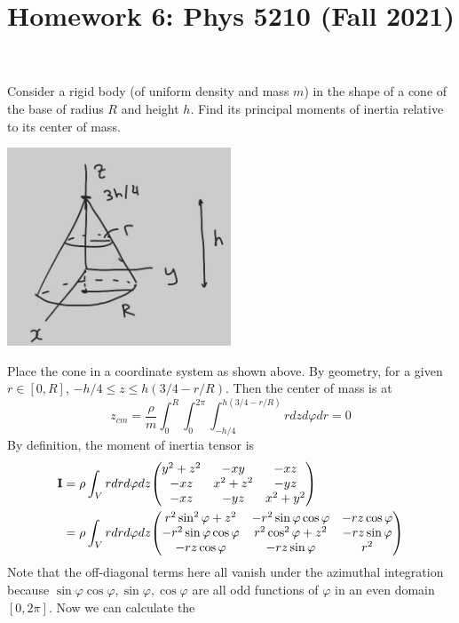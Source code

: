 \documentclass[12pt]{article}
\title{Homework 6: Phys 5210 (Fall 2021)}
\begin{document}
\maketitle
\begin{problem}{1}
Consider a rigid body (of uniform density and mass $m$) in the shape of a cone
of the base of radius $R$ and height $h$. Find its principal moments of inertia
relative to its center of mass.
\begin{solution}
\begin{center}
    \includegraphics[width=0.5\textwidth]{hw6_p1.jpg} 
\end{center}
Place the cone in a coordinate system as shown above. By geometry, for a given
$r\in[0,R]$, $-h /4\leq z\leq h(3 /4-r /R)$. Then the center of mass is at
\begin{equation}
    z_{cm}=\frac{\rho}{m}
        \int_0^R\int_0^{2\pi}\int_{-h/4}^{h(3/4-r/R)}rdzd\varphi dr
    =0
\end{equation}
By definition, the moment of inertia tensor is
\begin{align}
    \vb{I}&=\rho\int_Vrdrd\varphi dz\mqty(
        y^2+z^2 & -xy & -xz\\
        -xz & x^2 + z^2 & -yz\\
        -xz & -yz & x^2+y^2
    )\notag\\
    &=\rho\int_Vrdrd\varphi dz\mqty(
        r^2\sin^2\varphi+z^2 & -r^2\sin\varphi\cos\varphi & -rz\cos\varphi\\
        -r^2\sin\varphi\cos\varphi & r^2\cos^2\varphi+z^2 & -rz\sin\varphi\\
        -rz\cos\varphi & -rz\sin\varphi & r^2
    )
\end{align}
Note that the off-diagonal terms here all vanish under the azimuthal
integration because $\sin\varphi\cos\varphi,\sin\varphi,\cos\varphi$ are all odd
functions of $\varphi$ in an even domain $[0,2\pi]$. Now we can calculate the

\end{solution}
\end{problem}
\end{document}

